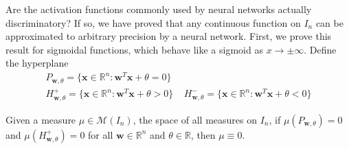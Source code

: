 \documentclass{article}
\numberwithin{equation}{subsection}
\begin{document}
Are the activation functions commonly used by neural networks actually discriminatory? If so, we have proved that any continuous function on $I_n$ can be approximated to arbitrary precision by a neural network. First, we prove this result for sigmoidal functions, which behave like a sigmoid as $x \to \pm \infty$. Define the hyperplane
\begin{gather*}
    P_{\textbf{w}, \theta} = \Big\{ \textbf{x} \in \mathbb{R}^n : \textbf{w}^T\textbf{x} + \theta = 0 \Big\} \\
    H^+_{\textbf{w},\theta} = \Big\{ \textbf{x} \in \mathbb{R}^n : \textbf{w}^T\textbf{x} + \theta > 0\Big\} \;\;\;\; H^-_{\textbf{w},\theta} = \Big\{ \textbf{x} \in \mathbb{R}^n : \textbf{w}^T\textbf{x} + \theta < 0\Big\}
\end{gather*}

\begin{lemma}
    Given a measure $\mu \in \mathcal{M}(I_n)$, the space of all measures on $I_n$, if $\mu(P_{\textbf{w},\theta}) = 0$ and $\mu(H^+_{\textbf{w},\theta}) = 0$ for all $\mathbf{w} \in \mathbb{R}^n$ and $\theta \in \mathbb{R}$, then $\mu \equiv 0$.
\end{lemma}
\end{document}
